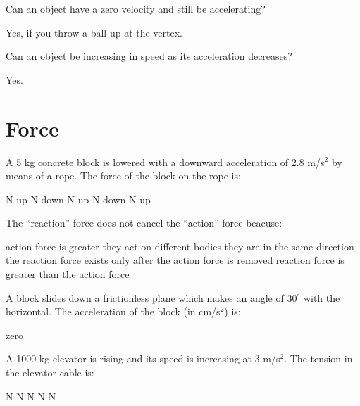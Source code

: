 \begin{questions}
\begin{parts}
  \end{parts}
  
  \question[1] Can an object have a zero velocity and still be
  accelerating?
  
  \begin{solution}
    Yes, if you throw a ball up at the vertex.
  \end{solution}
  
  \question[1] Can an object be increasing in speed as its
  acceleration decreases? 
  \begin{solution}
    Yes.
  \end{solution}
  
  \section{Force}
  
  \question[2] A 5 kg concrete block is lowered with a downward
  acceleration of 2.8 m/s$^2$ by means of a rope. The force of the
  block on the rope is:
  \begin{oneparchoices}
     N up
     N down
     N up
     N down
     N up
  \end{oneparchoices}
  
  \question[2] The ``reaction'' force does not cancel the ``action''
  force beacuse:
  \begin{oneparchoices}
    \choice action force is greater
    \CorrectChoice they act on different bodies
    \choice they are in the same direction
    \choice the reaction force exists only after the action force is
    removed
    \choice reaction force is greater than the action force
  \end{oneparchoices}
  
  \question[2] A block slides down a frictionless plane which makes
  an angle of $30^\circ$ with the horizontal. The acceleration of
  the block (in cm/s$^2$) is:
  \begin{oneparchoices}
    \choice zero
  \end{oneparchoices}
  
  \question[2] A 1000 kg elevator is rising and its speed is
  increasing at 3 m/s$^2$. The tension in the elevator cable is:
  \begin{oneparchoices}
     N
     N
     N
     N
     N
  \end{oneparchoices}
  

\end{questions}
